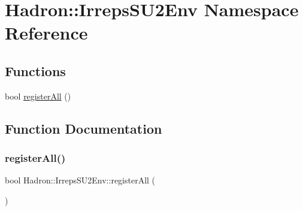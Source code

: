 \hypertarget{namespaceHadron_1_1IrrepsSU2Env}{}\section{Hadron\+:\+:Irreps\+S\+U2\+Env Namespace Reference}
\label{namespaceHadron_1_1IrrepsSU2Env}
\subsection*{Functions}
\begin{DoxyCompactItemize}
\item 
bool \mbox{\hyperlink{namespaceHadron_1_1IrrepsSU2Env_a431c2f7d56a7ee761b4dda2bb49cfd70}{register\+All}} ()
\end{DoxyCompactItemize}


\subsection{Function Documentation}
\mbox{\label{namespaceHadron_1_1IrrepsSU2Env_a431c2f7d56a7ee761b4dda2bb49cfd70}} 
\subsubsection{\texorpdfstring{registerAll()}{registerAll()}}
{\footnotesize\ttfamily bool Hadron\+::\+Irreps\+S\+U2\+Env\+::register\+All (\begin{DoxyParamCaption}{ }\end{DoxyParamCaption})}

